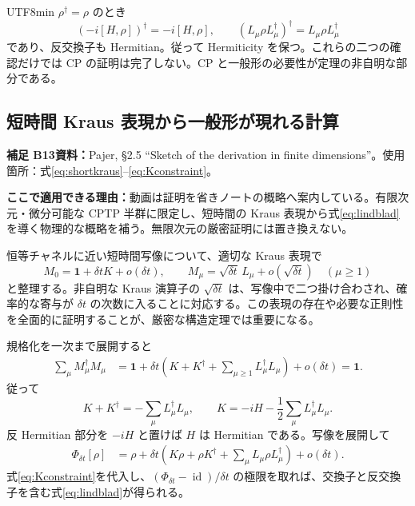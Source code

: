 \documentclass[11pt,a4paper]{article}
\numberwithin{equation}{section}
\newcommand{\id}{\operatorname{id}}
\newcommand{\I}{\mathbf{1}}
\newcommand{\supp}[3]{\par\smallskip\noindent\textcolor{BrickRed}{\textbf{補足 #1}}\quad\textbf{資料：}#2\par\noindent\textbf{ここで適用できる理由：}#3\par}
\begin{document}
\begin{CJK*}{UTF8}{min}
$\rho^\dagger=\rho$ のとき
\begin{equation}
(-i[H,\rho])^\dagger=-i[H,\rho],\qquad
(L_\mu\rho L_\mu^\dagger)^\dagger=L_\mu\rho L_\mu^\dagger
\end{equation}
であり、反交換子も Hermitian。従って Hermiticity を保つ。これらの二つの確認だけでは CP の証明は完了しない。CP と一般形の必要性が定理の非自明な部分である。

\subsection{短時間 Kraus 表現から一般形が現れる計算}
\supp{B13}{Pajer\cite{pajer}, §2.5 ``Sketch of the derivation in finite dimensions''。使用箇所：式\eqref{eq:shortkraus}--\eqref{eq:Kconstraint}。}{動画は証明を省きノートの概略へ案内している。有限次元・微分可能な CPTP 半群に限定し、短時間の Kraus 表現から式\eqref{eq:lindblad}を導く物理的な概略を補う。無限次元の厳密証明には置き換えない。}
恒等チャネルに近い短時間写像について、適切な Kraus 表現で
\begin{equation}
M_0=\I+\delta t K+o(\delta t),
\qquad M_\mu=\sqrt{\delta t}\,L_\mu+o(\sqrt{\delta t})
\quad(\mu\geq1)
\label{eq:shortkraus}
\end{equation}
と整理する。非自明な Kraus 演算子の $\sqrt{\delta t}$ は、写像中で二つ掛け合わされ、確率的な寄与が $\delta t$ の次数に入ることに対応する。この表現の存在や必要な正則性を全面的に証明することが、厳密な構造定理では重要になる。

規格化を一次まで展開すると
\begin{align}
\sum_\mu M_\mu^\dagger M_\mu
&=\I+\delta t\left(K+K^\dagger+
\sum_{\mu\geq1}L_\mu^\dagger L_\mu\right)+o(\delta t)=\I.
\end{align}
従って
\begin{equation}
K+K^\dagger=-\sum_\mu L_\mu^\dagger L_\mu,
\qquad K=-iH-\frac12\sum_\mu L_\mu^\dagger L_\mu.
\label{eq:Kconstraint}
\end{equation}
反 Hermitian 部分を $-iH$ と置けば $H$ は Hermitian である。写像を展開して
\begin{align}
\Phi_{\delta t}[\rho]
&=\rho+\delta t\left(K\rho+\rho K^\dagger+
\sum_\mu L_\mu\rho L_\mu^\dagger\right)+o(\delta t).
\end{align}
式\eqref{eq:Kconstraint}を代入し、$(\Phi_{\delta t}-\id)/\delta t$ の極限を取れば、交換子と反交換子を含む式\eqref{eq:lindblad}が得られる。


\end{CJK*}
\end{document}

